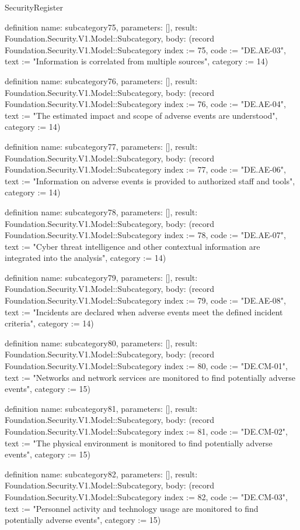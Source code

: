 \begin{lexlean}{SecurityRegister}
\begin{semanticmodule}
definition{
  name: subcategory75,
  parameters: [],
  result: Foundation.Security.V1.Model::Subcategory,
  body: (record Foundation.Security.V1.Model::Subcategory {index := 75, code := "DE.AE-03", text := "Information is correlated from multiple sources", category := 14})
}

definition{
  name: subcategory76,
  parameters: [],
  result: Foundation.Security.V1.Model::Subcategory,
  body: (record Foundation.Security.V1.Model::Subcategory {index := 76, code := "DE.AE-04", text := "The estimated impact and scope of adverse events are understood", category := 14})
}

definition{
  name: subcategory77,
  parameters: [],
  result: Foundation.Security.V1.Model::Subcategory,
  body: (record Foundation.Security.V1.Model::Subcategory {index := 77, code := "DE.AE-06", text := "Information on adverse events is provided to authorized staff and tools", category := 14})
}

definition{
  name: subcategory78,
  parameters: [],
  result: Foundation.Security.V1.Model::Subcategory,
  body: (record Foundation.Security.V1.Model::Subcategory {index := 78, code := "DE.AE-07", text := "Cyber threat intelligence and other contextual information are integrated into the analysis", category := 14})
}

definition{
  name: subcategory79,
  parameters: [],
  result: Foundation.Security.V1.Model::Subcategory,
  body: (record Foundation.Security.V1.Model::Subcategory {index := 79, code := "DE.AE-08", text := "Incidents are declared when adverse events meet the defined incident criteria", category := 14})
}

definition{
  name: subcategory80,
  parameters: [],
  result: Foundation.Security.V1.Model::Subcategory,
  body: (record Foundation.Security.V1.Model::Subcategory {index := 80, code := "DE.CM-01", text := "Networks and network services are monitored to find potentially adverse events", category := 15})
}

definition{
  name: subcategory81,
  parameters: [],
  result: Foundation.Security.V1.Model::Subcategory,
  body: (record Foundation.Security.V1.Model::Subcategory {index := 81, code := "DE.CM-02", text := "The physical environment is monitored to find potentially adverse events", category := 15})
}

definition{
  name: subcategory82,
  parameters: [],
  result: Foundation.Security.V1.Model::Subcategory,
  body: (record Foundation.Security.V1.Model::Subcategory {index := 82, code := "DE.CM-03", text := "Personnel activity and technology usage are monitored to find potentially adverse events", category := 15})
}


\end{semanticmodule}
\end{lexlean}
